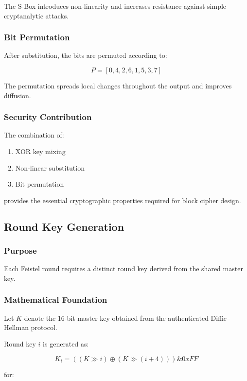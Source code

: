 \documentclass[12pt]{article}
\begin{document}
The S-Box introduces non-linearity and increases resistance against simple cryptanalytic attacks.

\subsubsection{Bit Permutation}

After substitution, the bits are permuted according to:

\[
P = [0, 4, 2, 6, 1, 5, 3, 7]
\]

The permutation spreads local changes throughout the output and improves diffusion.

\subsubsection{Security Contribution}

The combination of:

\begin{enumerate}
\item XOR key mixing
\item Non-linear substitution
\item Bit permutation
\end{enumerate}

provides the essential cryptographic properties required for block cipher design.

\subsection{Round Key Generation}

\subsubsection{Purpose}

Each Feistel round requires a distinct round key derived from the shared master key.

\subsubsection{Mathematical Foundation}

Let $K$ denote the 16-bit master key obtained from the authenticated Diffie--Hellman protocol.

Round key $i$ is generated as:

\[
K_i = \left( (K \gg i) \oplus (K \gg (i+4)) \right) \mathbin{\&} 0xFF
\]

for:
\end{document}
